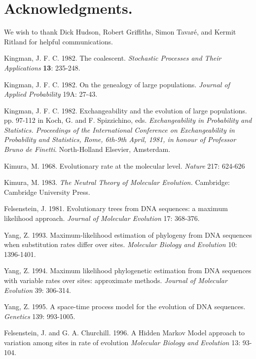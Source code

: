 \section*{Acknowledgments.} 

We wish to thank Dick Hudson, Robert Griffiths, Simon Tavar\'e, and Kermit
Ritland for helpful communications.


\begin{thebibliography}{20}
\footnotesize


Kingman, J. F. C. 1982.  The coalescent.  {\it Stochastic Processes and Their
Applications}  {\bf 13}: 235-248.

Kingman, J. F. C. 1982.  On the genealogy of large populations.  {\it
Journal of Applied Probability}  19A: 27-43.

Kingman, J. F. C. 1982.  Exchangeability and the evolution of large populations.
pp. 97-112 in Koch, G. and F. Spizzichino, eds. {\it Exchangeability in
Probability and Statistics. Proceedings of the International Conference on
Exchangeability in Probability and Statistics, Rome, 6th-9th April, 1981, in
honour of Professor Bruno de Finetti}. North-Holland Elsevier, Amsterdam.

Kimura, M.  1968.  Evolutionary rate at the molecular level.  
{\it Nature} 217: 624-626

Kimura, M. 1983.  {\it The Neutral Theory of Molecular Evolution.}
Cambridge: Cambridge University Press.

Felsenstein, J.  1981.  Evolutionary trees from DNA sequences: a maximum
likelihood approach.  {\it Journal of Molecular Evolution} 17: 368-376.

Yang, Z.  1993.  Maximum-likelihood estimation of phylogeny from DNA sequences
when substitution rates differ over sites.  {\it Molecular Biology and
Evolution}  10: 1396-1401.

Yang, Z.  1994.  Maximum likelihood phylogenetic estimation from DNA sequences
with variable rates over sites: approximate methods.  {\it Journal of Molecular
Evolution}  39: 306-314.

Yang, Z.  1995.  A space-time process model for the evolution of DNA sequences.
{\it Genetics}  139: 993-1005.

Felsenstein, J. and G. A. Churchill. 1996.
A Hidden Markov Model approach to variation among sites in rate of evolution
{\it Molecular Biology and Evolution}  13: 93-104.


\end{thebibliography}
